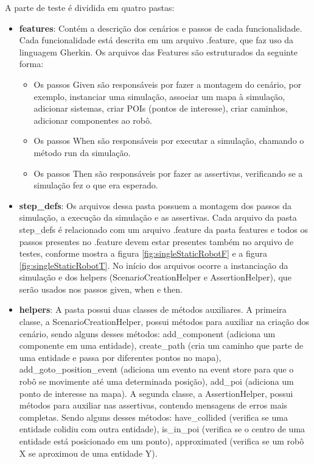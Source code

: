 A parte de teste é dividida em quatro pastas:
\begin{itemize}
    \item \textbf{features}: Contém a descrição dos cenários e passos de cada funcionalidade. Cada funcionalidade está descrita em um arquivo .feature, que faz uso da linguagem Gherkin. Os arquivos das Features são estruturados da seguinte forma:
    \begin{itemize}
        \item Os passos Given são responsáveis por fazer a montagem do cenário, por exemplo, instanciar uma simulação, associar um mapa à simulação, adicionar sistemas, criar POIs (pontos de interesse), criar caminhos, adicionar componentes ao robô.
        \item Os passos When são responsáveis por executar a simulação, chamando o método run da simulação.
        \item Os passos Then são responsáveis por fazer as assertivas, verificando se a simulação fez o que era esperado.
    \end{itemize}
    \item \textbf{step\_defs}: Os arquivos dessa pasta possuem a montagem dos passos da simulação, a execução da simulação e as assertivas. Cada arquivo da pasta step\_defs é relacionado com um arquivo .feature da pasta features e todos os passos presentes no .feature devem estar presentes também no arquivo de testes, conforme mostra a figura \ref{fig:singleStaticRobotF} e a figura \ref{fig:singleStaticRobotT}. 
No início dos arquivos ocorre a instanciação da simulação e dos helpers (ScenarioCreationHelper e AssertionHelper), que serão usados nos passos given, when e then.
    \item \textbf{helpers}: A pasta possui duas classes de métodos auxiliares. A primeira classe, a ScenarioCreationHelper, possui métodos para auxiliar na criação dos cenário, sendo alguns desses métodos: add\_component (adiciona um componente em uma entidade), create\_path (cria um caminho que parte de uma entidade e passa por diferentes pontos no mapa), add\_goto\_position\_event (adiciona um evento na event store para que o robô se movimente até uma determinada posição), add\_poi (adiciona um ponto de interesse na mapa). A segunda classe, a AssertionHelper, possui métodos para auxiliar nas assertivas, contendo mensagens de erros mais completas. Sendo alguns desses métodos: have\_collided (verifica se uma entidade colidiu com outra entidade), is\_in\_poi (verifica se o centro de uma entidade está posicionado em um ponto), approximated (verifica se um robô X se aproximou de uma entidade Y).
    

\end{itemize}
